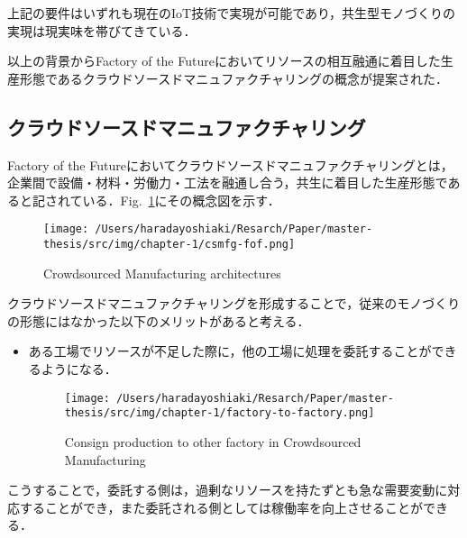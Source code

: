 上記の要件はいずれも現在のIoT技術で実現が可能であり，共生型モノづくりの実現は現実味を帯びてきている．

以上の背景からFactory of the
Futureにおいてリソースの相互融通に着目した生産形態であるクラウドソースドマニュファクチャリングの概念が提案された\cite{Factory2015}．

\hypertarget{ux30afux30e9ux30a6ux30c9ux30bdux30fcux30b9ux30c9ux30deux30cbux30e5ux30d5ux30a1ux30afux30c1ux30e3ux30eaux30f3ux30b0}{%
\subsection{クラウドソースドマニュファクチャリング}\label{ux30afux30e9ux30a6ux30c9ux30bdux30fcux30b9ux30c9ux30deux30cbux30e5ux30d5ux30a1ux30afux30c1ux30e3ux30eaux30f3ux30b0}}

Factory of the
Futureにおいてクラウドソースドマニュファクチャリングとは，企業間で設備・材料・労働力・工法を融通し合う，共生に着目した生産形態であると記されている\cite{Factory2015}．Fig.~\ref{fig:csfmg-fof}にその概念図を示す．

\begin{figure}[H]
\hypertarget{fig:csfmg-fof}{%
\centering
\texttt{[image: /Users/haradayoshiaki/Resarch/Paper/master-thesis/src/img/chapter-1/csmfg-fof.png]}
\caption{Crowdsourced Manufacturing architectures
\cite{Factory2015}}\label{fig:csfmg-fof}
}
\end{figure}

クラウドソースドマニュファクチャリングを形成することで，従来のモノづくりの形態にはなかった以下のメリットがあると考える\cite{KATSUMURA2016}．

\begin{itemize}
\item
  ある工場でリソースが不足した際に，他の工場に処理を委託することができるようになる．

  \begin{figure}[H]
  \hypertarget{fig:factory-to-factory}{%
  \centering
  \texttt{[image: /Users/haradayoshiaki/Resarch/Paper/master-thesis/src/img/chapter-1/factory-to-factory.png]}
  \caption{Consign production to other factory in Crowdsourced
  Manufacturing}\label{fig:factory-to-factory}
  }
  \end{figure}
\end{itemize}

こうすることで，委託する側は，過剰なリソースを持たずとも急な需要変動に対応することができ，また委託される側としては稼働率を向上させることができる．

